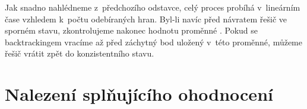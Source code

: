 Jak snadno nahlédneme z~předchozího odstavce, celý proces probíhá v~lineárním čase vzhledem k~počtu odebíraných hran. Byl-li navíc před návratem řešič ve sporném stavu, zkontrolujeme nakonec hodnotu proměnné . Pokud se backtrackingem vracíme až před záchytný bod uložený v~této proměnné, můžeme řešič vrátit zpět do konzistentního stavu.

\section{Nalezení splňujícího ohodnocení}
